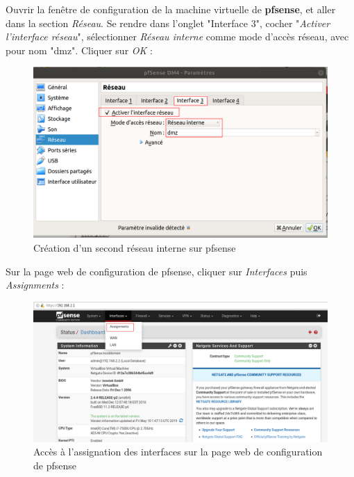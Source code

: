 \pagebreak
Ouvrir la fenêtre de configuration de la machine virtuelle de \textbf{pfsense}, et aller dans la section \textit{Réseau}. Se rendre dans l'onglet "Interface 3", cocher "\textit{Activer l'interface réseau}", sélectionner \textit{Réseau interne} comme mode d'accès réseau, avec pour nom "dmz". Cliquer sur \textit{OK} :
  \begin{figure}[h!]
     \begin{center}
         \includegraphics[scale=0.5]{Debian_screenshots/Config/7.png}
         \caption{Création d'un second réseau interne sur pfsense}
         \label{Debian_screenshots/Config/7}
     \end{center}
  \end{figure}
  \FloatBarrier
     
Sur la page web de configuration de pfsense, cliquer sur \textit{Interfaces} puis \textit{Assignments} :
  \begin{figure}[h!]
     \begin{center}
         \includegraphics[scale=0.5]{Debian_screenshots/Config/8.png}
         \caption{Accès à l'assignation des interfaces sur la page web de configuration de pfsense}
         \label{Debian_screenshots/Config/8}
     \end{center}
  \end{figure}
  \FloatBarrier

